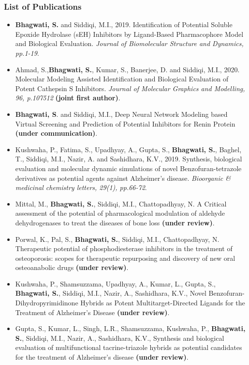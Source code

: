 \documentclass{beamer}
\begin{document}
\begin{frame}
\frametitle{\textbf{List of Publications}}
\tiny
\begin{itemize}
\item \textbf{Bhagwati, S.} and Siddiqi, M.I., 2019. Identification of Potential Soluble Epoxide Hydrolase (sEH) Inhibitors by Ligand-Based Pharmacophore Model and Biological Evaluation. \textit{Journal of Biomolecular Structure and Dynamics, pp.1-19}.
\item Ahmad, S.,{\textbf{Bhagwati, S.}, Kumar, S., Banerjee, D. and Siddiqi, M.I., 2020. Molecular Modeling Assisted Identification and Biological Evaluation of Potent Cathepsin S Inhibitors. \textit{Journal of Molecular Graphics and Modelling, 96, p.107512} \textbf{(joint first author)}}.
\item \textbf{Bhagwati, S}. and Siddiqi, M.I., Deep Neural Network Modeling based Virtual Screening and Prediction of Potential Inhibitors for Renin Protein \textbf{(under communication)}.
\item Kushwaha, P., Fatima, S., Upadhyay, A., Gupta, S., \textbf{Bhagwati, S.}, Baghel, T., Siddiqi, M.I., Nazir, A. and Sashidhara, K.V., 2019. Synthesis, biological evaluation and molecular dynamic simulations of novel Benzofuran-tetrazole derivatives as potential agents against Alzheimer’s disease. \textit{Bioorganic \& medicinal chemistry letters, 29(1), pp.66-72}.
\item Mittal, M., \textbf{Bhagwati, S.}, Siddiqi, M.I., Chattopadhyay, N. A Critical assessment of the potential of pharmacological modulation of aldehyde dehydrogenases to treat the diseases of bone loss \textbf{(under review)}.
\item Porwal, K., Pal, S., \textbf{Bhagwati, S.}, Siddiqi, M.I., Chattopadhyay, N. Therapeutic potential of phosphodiesterase inhibitors in the treatment of osteoporosis: scopes for therapeutic repurposing and discovery of new oral osteoanabolic drugs \textbf{(under review)}.
\item Kushwaha, P., Shamsuzzama, Upadhyay, A., Kumar, L., Gupta, S., \textbf{Bhagwati, S.}, Siddiqi, M.I., Nazir, A., Sashidhara, K.V., Novel Benzofuran-Dihydropyrimidinone Hybrids as Potent Multitarget-Directed Ligands for the Treatment of Alzheimer’s Disease \textbf{(under review)}.
\item Gupta, S., Kumar, L., Singh, L.R., Shamsuzzama, Kushwaha, P., \textbf{Bhagwati, S.}, Siddiqi, M.I., Nazir, A., Sashidhara, K.V., Synthesis and biological evaluation of multifunctional tacrine-triazole hybrids as potential candidates for the treatment of Alzheimer’s disease \textbf{(under review)}.

\end{itemize}
\end{frame}
\end{document}
